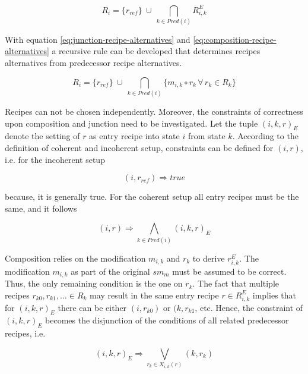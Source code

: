 \documentclass[12pt,a4paper]{scrartcl}
\begin{document}
\begin{equation} \label{eq:junction-recipe-alternatives}
    R_i = \{ r_{ref} \} \
             \cup       \
          \bigcap_{k\in Pred(i)} R^E_{i,k} 
\end{equation}

With equation \eqref{eq:junction-recipe-alternatives} and
\eqref{eq:composition-recipe-alternatives} a recursive rule can be developed
that determines recipes alternatives from predecessor recipe alternatives.

\begin{equation} \label{eq:recursively-recipe-alternatives}
    R_i = \{ r_{ref} \} \
             \cup       \
          \bigcap_{k\in Pred(i)} \{ m_{i,k} \circ r_k \,\forall\,r_k\in R_k \} 
\end{equation}

Recipes can not be chosen independently. Moreover, the constraints of
correctness upon composition and junction need to be investigated.  Let the
tuple $(i, k, r)_E$ denote the setting of $r$ as entry recipe into state $i$
from state $k$.  According to the definition of coherent and incoherent setup,
constraints can be defined for $(i,r)$, i.e. for the incoherent setup

\begin{equation} \label{eq:constraint-junction-incoherent}
    (i, r_{ref}) \Rightarrow true
\end{equation}

because, it is generally true. For the coherent setup all entry recipes must
be the same, and it follows

\begin{equation} \label{eq:constraint-junction-coherent}
    (i, r) \Rightarrow \bigwedge_{k\in Pred(i)} (i,k,r)_E 
\end{equation}

Composition relies on the modification $m_{i,k}$ and $r_k$ to derive
$r^E_{i,k}$.  The modification $m_{i,k}$ as part of the original $sm_m$ must be
assumed to be correct.  Thus, the only remaining condition is the one on $r_k$.
The fact that multiple recipes $r_{k0},r_{k1},\ldots \in R_k$ may result in the
same entry recipe $r\in R^E_{i,k}$ implies that for $(i,k,r)_E$ there can
be either $(i,r_{k0})$ or $(k, r_{k1}$, etc.  Hence, the constraint of
$(i,k,r)_E$ becomes the disjunction of the conditions of all related
predecessor recipes, i.e. 

\begin{equation} \label{eq:constraint-composition}
    (i,k,r)_E \Rightarrow \bigvee_{r_k\in X_{i,k}(r)} (k,r_k) 
\end{equation}
\end{document}
